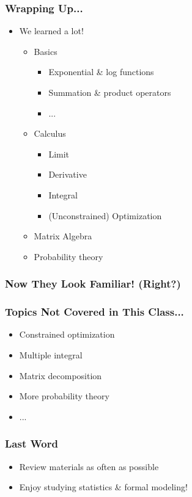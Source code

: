 \documentclass[pdflatex, 12pt]{beamer}
\begin{document}
\begin{frame}
\frametitle{Wrapping Up...}
\begin{itemize}
\item We learned a lot!
 \begin{itemize} 
 \item Basics
  \begin{itemize}
  \item Exponential \& log functions
  \item Summation \& product operators
  \item ...
  \end{itemize}
 \item Calculus
  \begin{itemize}
  \item Limit
  \item Derivative
  \item Integral
  \item (Unconstrained) Optimization
  \end{itemize}
 \item Matrix Algebra
 \item Probability theory
 \end{itemize}
\end{itemize}
\end{frame}

\begin{frame}
\frametitle{Now They Look Familiar! (Right?)}
\centering
{}
\end{frame}

\begin{frame}
\frametitle{Topics Not Covered in This Class...}
\begin{itemize}
\item Constrained optimization
\vspace{0.4cm}
\item Multiple integral
\vspace{0.4cm}
\item Matrix decomposition
\vspace{0.4cm}
\item More probability theory
\vspace{0.4cm}
\item ...
\end{itemize}
\end{frame}

\begin{frame}
\frametitle{Last Word}
\begin{itemize}
\item Review materials as often as possible
\vspace{0.4cm}
\item Enjoy studying statistics \& formal modeling!
\end{itemize}
\end{frame}
\end{document}

